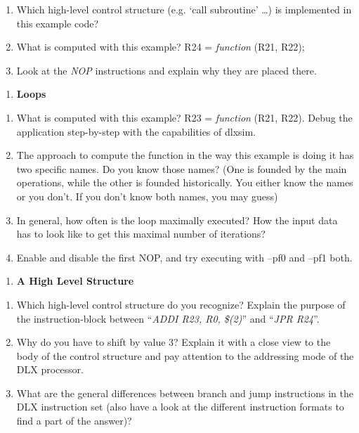 \documentclass[
]{article}
\begin{document}
\begin{enumerate}
\def\labelenumi{\alph{enumi})}
\item
  Which high-level control structure (e.g. `call subroutine' \ldots) is
  implemented in this example code?
\item
  What is computed with this example? R24 = \emph{function} (R21, R22);
\item
  Look at the \emph{NOP} instructions and explain why they are placed
  there.
\end{enumerate}

\begin{enumerate}
\def\labelenumi{\arabic{enumi}.}
\setcounter{enumi}{4}
\item
  \textbf{Loops}
\end{enumerate}

\begin{enumerate}
\def\labelenumi{\alph{enumi})}
\item
  What is computed with this example? R23 = \emph{function} (R21, R22).
  Debug the application step-by-step with the capabilities of dlxsim.
\item
  The approach to compute the function in the way this example is doing
  it has two specific names. Do you know those names? (One is founded by
  the main operations, while the other is founded historically. You
  either know the names or you don't. If you don't know both names, you
  may guess)
\item
  In general, how often is the loop maximally executed? How the input
  data has to look like to get this maximal number of iterations?
\item
  Enable and disable the first NOP, and try executing with --pf0 and
  --pf1 both.
\end{enumerate}

\begin{enumerate}
\def\labelenumi{\arabic{enumi}.}
\setcounter{enumi}{5}
\item
  \textbf{A High Level Structure}
\end{enumerate}

\begin{enumerate}
\def\labelenumi{\alph{enumi})}
\item
  Which high-level control structure do you recognize? Explain the
  purpose of the instruction-block between ``\emph{ADDI R23, R0,
  \$(2)}'' and ``\emph{JPR R24}''.
\item
  Why do you have to shift by value 3? Explain it with a close view to
  the body of the control structure and pay attention to the addressing
  mode of the DLX processor.
\item
  What are the general differences between branch and jump instructions
  in the DLX instruction set (also have a look at the different
  instruction formats to find a part of the answer)?
\end{enumerate}
\end{document}
